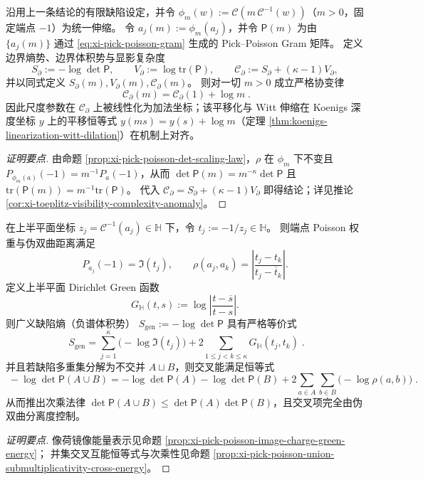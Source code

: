 \begin{conclusion}\label{con:xi-terminal-visibility-complexity-logm-translation}
沿用上一条结论的有限缺陷设定，并令 \(\phi_m(w):=\mathcal{C}(m\,\mathcal{C}^{-1}(w))\)（\(m>0\)，固定端点 \(-1\)）为统一伸缩。
令 \(a_j(m):=\phi_m(a_j)\)，并令 \(\mathsf P(m)\) 为由 \(\{a_j(m)\}\) 通过 \eqref{eq:xi-pick-poisson-gram} 生成的 Pick--Poisson Gram 矩阵。
定义边界熵势、边界体积势与显影复杂度
\[
S_{\partial}:=-\log\det\mathsf P,
\qquad
V_{\partial}:=\log\mathrm{tr}(\mathsf P),
\qquad
\mathscr{C}_{\partial}:=S_{\partial}+(\kappa-1)V_{\partial},
\]
并以同式定义 \(S_{\partial}(m),V_{\partial}(m),\mathscr{C}_{\partial}(m)\)。
则对一切 \(m>0\) 成立严格协变律
\[
\boxed{\;
\mathscr{C}_{\partial}(m)=\mathscr{C}_{\partial}(1)+\log m\; }.
\]
因此尺度参数在 \(\mathscr{C}_{\partial}\) 上被线性化为加法坐标；该平移化与 Witt 伸缩在 Koenigs 深度坐标 \(y\) 上的平移恒等式 \(y(ms)=y(s)+\log m\)（定理 \ref{thm:koenigs-linearization-witt-dilation}）在机制上对齐。
\end{conclusion}
\begin{proof}[证明要点]
由命题 \ref{prop:xi-pick-poisson-det-scaling-law}，\(\rho\) 在 \(\phi_m\) 下不变且 \(P_{\phi_m(a)}(-1)=m^{-1}P_a(-1)\)，从而 \(\det\mathsf P(m)=m^{-\kappa}\det\mathsf P\) 且 \(\mathrm{tr}(\mathsf P(m))=m^{-1}\mathrm{tr}(\mathsf P)\)。
代入 \(\mathscr{C}_{\partial}=S_{\partial}+(\kappa-1)V_{\partial}\) 即得结论；详见推论 \ref{cor:xi-toeplitz-visibility-complexity-anomaly}。
\end{proof}



\begin{conclusion}\label{con:xi-terminal-pick-poisson-green-mirror-energy}
在上半平面坐标 \(z_j=\mathcal{C}^{-1}(a_j)\in\mathbb{H}\) 下，令
\(
t_j:=-1/z_j\in\mathbb{H}
\)。
则端点 Poisson 权重与伪双曲距离满足
\[
P_{a_j}(-1)=\Im(t_j),
\qquad
\rho(a_j,a_k)=\left|\frac{t_j-t_k}{t_j-\overline t_k}\right|.
\]
定义上半平面 Dirichlet Green 函数
\[
G_{\mathbb{H}}(t,s):=\log\left|\frac{t-\overline s}{t-s}\right|.
\]
则广义缺陷熵（负谱体积势）
\(
S_{\mathrm{gen}}:=-\log\det\mathsf P
\)
具有严格等价式
\[
\boxed{\;
S_{\mathrm{gen}}
=\sum_{j=1}^{\kappa}\bigl(-\log\Im(t_j)\bigr)
+2\sum_{1\le j<k\le\kappa}G_{\mathbb{H}}(t_j,t_k)\; }.
\]
并且若缺陷多重集分解为不交并 \(A\sqcup B\)，则交叉能满足恒等式
\[
\boxed{\;
-\log\det\mathsf P(A\cup B)
=-\log\det\mathsf P(A)-\log\det\mathsf P(B)
+2\sum_{a\in A}\sum_{b\in B}\bigl(-\log\rho(a,b)\bigr)\; }.
\]
从而推出次乘法律 \(\det\mathsf P(A\cup B)\le \det\mathsf P(A)\det\mathsf P(B)\)，且交叉项完全由伪双曲分离度控制。
\end{conclusion}
\begin{proof}[证明要点]
像荷镜像能量表示见命题 \ref{prop:xi-pick-poisson-image-charge-green-energy}；
并集交叉互能恒等式与次乘性见命题 \ref{prop:xi-pick-poisson-union-submultiplicativity-cross-energy}。
\end{proof}


